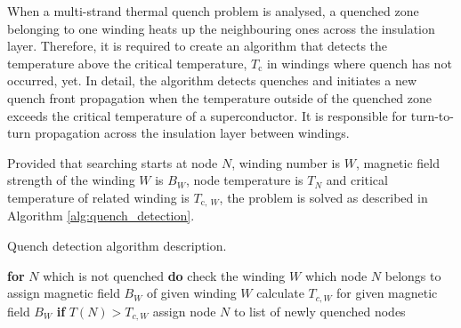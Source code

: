 
When a multi-strand thermal quench problem is analysed, a quenched zone belonging to one winding heats up the neighbouring ones across the insulation layer. Therefore, it is required to create an algorithm that detects the temperature above the critical temperature, $T_\text{c}$ in windings where quench has not occurred, yet. In detail, the algorithm detects quenches and initiates a new quench front propagation  when the temperature outside of the quenched zone exceeds the critical temperature of a superconductor. It is responsible for turn-to-turn propagation across the insulation layer between windings.

\newpage
Provided that searching starts at node $N$, winding number is $W$, magnetic field strength of the winding $W$ is $B_W$, node temperature is $T_N$ and critical temperature of related winding is $T_{\text{c},~W}$, the problem is solved as described in Algorithm \ref{alg:quench_detection}.

\begin{algorithm}[H]
    \caption{Quench detection algorithm description.}
    \label{alg:quench_detection}
    \begin{algorithmic}[1]
    \STATE \textbf{for} $N$ which is not quenched \textbf{do}
    \STATE \hspace{0.5cm} check the winding $W$ which node $N$ belongs to
    \STATE \hspace{0.5cm} assign magnetic field $B_W$ of given winding $W$
    \STATE \hspace{0.5cm} calculate $T_{c,W}$ for given magnetic field $B_W$
    \STATE \hspace{0.5cm} \textbf{if} $T(N) > T_{c,W}$
    \STATE \hspace{1.0cm} assign node $N$ to list of newly quenched nodes
    \end{algorithmic}
\end{algorithm}